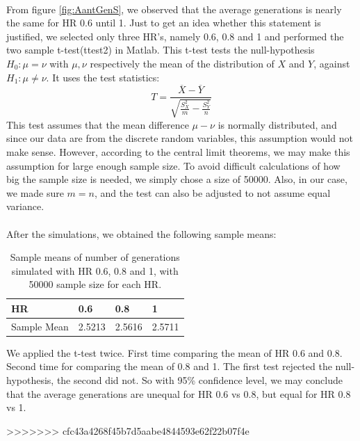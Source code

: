 \\
From figure \ref{fig:AantGenS}, we observed that the average generations is nearly the same for HR 0.6 until 1. Just to get an idea whether this statement is justified, we selected only three HR's, namely 0.6, 0.8 and 1 and performed the two sample t-test(ttest2) in Matlab. This t-test tests the null-hypothesis $H_0:\mu=\nu$ with $\mu,\nu$ respectively the mean of the distribution of $X$ and $Y$, against $H_1:\mu\neq\nu$. It uses the test statistics:
 \[T=\frac{\overline{X}-\overline{Y}}{\sqrt{\frac{S^2_X}{m}-\frac{S^2_Y}{n}}}\]
This test assumes that the mean difference $\mu-\nu$ is normally distributed, and since our data are from the discrete random variables, this assumption would not make sense. However, according to the central limit theorems, we may make this assumption for large enough sample size. To avoid difficult calculations of how big the sample size is needed, we simply chose a size of 50000. Also, in our case, we made sure $m=n$, and the test can also be adjusted to not assume equal variance.\\
\\
After the simulations, we obtained the following sample means:
\begin{table}[htp]
\centering
\caption{Sample means of number of generations simulated with HR 0.6, 0.8 and 1, with 50000 sample size for each HR.}
\begin{tabular}{|l|l|l|l|}
\hline
 HR&0.6&0.8&1 \\ \hline
 Sample Mean&2.5213&2.5616&2.5711  \\ \hline 
\end{tabular}
\end{table}
We applied the t-test twice. First time comparing the mean of HR 0.6 and 0.8. Second time for comparing the mean of 0.8 and 1. The first test rejected the null-hypothesis, the second did not. So with 95\% confidence level, we may conclude that the average generations are unequal for HR 0.6 vs 0.8, but equal for HR 0.8 vs 1.




>>>>>>> cfc43a4268f45b7d5aabe4844593e62f22b07f4e

